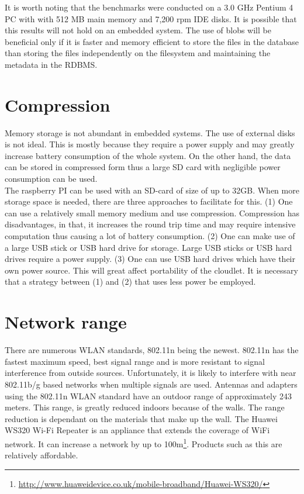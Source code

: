 \noindent It is worth noting that the benchmarks were conducted on a 3.0 GHz Pentium 4 PC with with 512 MB main memory and 7,200 rpm IDE disks. It is possible that this results will not hold on an embedded system.
The use of blobs will be beneficial only if it is faster and memory efficient to store the files in the database than storing the files independently on the filesystem and maintaining the metadata in the RDBMS.

\section{Compression}
Memory storage is not abundant in embedded systems. The use of external disks is not ideal. This is mostly because they require a power supply and may greatly increase battery consumption of the whole system. On
the other hand, the data can be stored in compressed form thus a large SD card with negligible power consumption can be used.\\

\noindent The raspberry PI can be used with an SD-card of size of up to 32GB\cite{raspwebsite}. When more
storage space is needed, there are three approaches to facilitate for this. (1)
One can use a relatively small memory medium and use compression. Compression has disadvantages, in that, it increases the round trip time and may require intensive computation thus causing a lot of battery
consumption. (2) One can make use of a large USB stick or USB hard drive for storage. Large USB sticks or USB hard drives require a power supply. (3) One can use USB hard drives which have their own power source.
This will great affect portability of the cloudlet. It is necessary that a strategy between (1) and (2) that uses less power be employed.


\section{Network range}

There are numerous WLAN standards, 802.11n being the newest. 802.11n has the fastest maximum speed, best signal range and is more resistant to signal interference from outside sources\cite{RefWorks:104}.
Unfortunately, it is likely to interfere with near 802.11b/g based networks when multiple signals are used\cite{RefWorks:104}. Antennas and adapters using the 802.11n WLAN standard have an outdoor range of
approximately 243 meters\cite{RefWorks:103}. This range, is greatly reduced indoors because of the walls. The range reduction is dependant on the materials that make up the wall. The Huawei WS320 Wi-Fi Repeater
is an appliance that extends the coverage of WiFi network. It can increase a network by up to 100m\footnote{\url{http://www.huaweidevice.co.uk/mobile-broadband/Huawei-WS320/}}. Products such as this are relatively affordable.\newline

